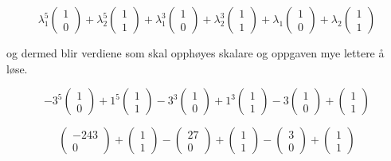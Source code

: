 \documentclass[a4paper,10pt,norsk]{article}
\begin{document}
\[\lambda_{1}^{5}\left(\begin{matrix} 1\\0 \end{matrix}\right) + \lambda_{2}^{5}\left(\begin{matrix} 1\\1 \end{matrix}\right) + \lambda_{1}^{3}\left(\begin{matrix} 1\\0 \end{matrix}\right) + \lambda_{2}^{3}\left(\begin{matrix} 1\\1 \end{matrix}\right) + \lambda_{1}\left(\begin{matrix} 1\\0 \end{matrix}\right) + \lambda_{2}\left(\begin{matrix} 1\\1 \end{matrix}\right)\]

og dermed blir verdiene som skal opphøyes skalare og oppgaven mye lettere å løse.

\[-3^{5}\left(\begin{matrix} 1\\0 \end{matrix}\right) + 1^{5}\left(\begin{matrix} 1\\1 \end{matrix}\right) - 3^{3}\left(\begin{matrix} 1\\0 \end{matrix}\right) + 1^{3}\left(\begin{matrix} 1\\1 \end{matrix}\right) - 3\left(\begin{matrix} 1\\0 \end{matrix}\right) + \left(\begin{matrix} 1\\1 \end{matrix}\right)\]

\[\left(\begin{matrix} -243\\0 \end{matrix}\right) + \left(\begin{matrix} 1\\1 \end{matrix}\right) - \left(\begin{matrix} 27\\0 \end{matrix}\right) + \left(\begin{matrix} 1\\1 \end{matrix}\right) - \left(\begin{matrix} 3\\0 \end{matrix}\right) + \left(\begin{matrix} 1\\1 \end{matrix}\right)\]
\end{document}
